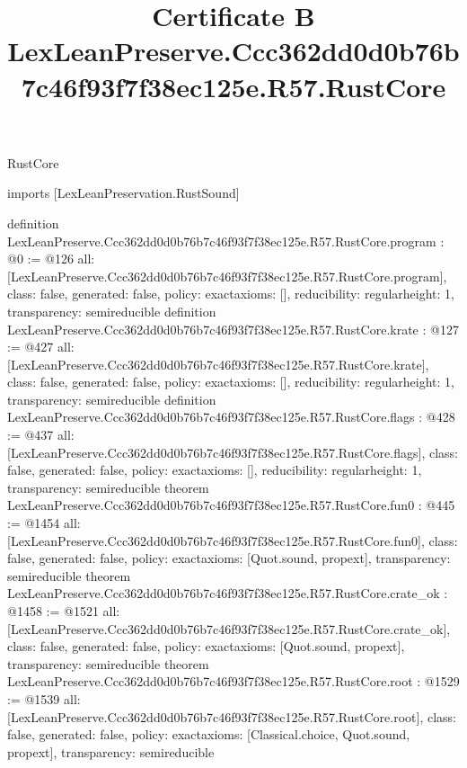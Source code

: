 \begin{lexlean}{RustCore}
\title{Certificate B LexLeanPreserve.Ccc362dd0d0b76b7c46f93f7f38ec125e.R57.RustCore}
\begin{coremodule}
imports [LexLeanPreservation.RustSound]

definition LexLeanPreserve.Ccc362dd0d0b76b7c46f93f7f38ec125e.R57.RustCore.program : @0 := @126 {
  all: [LexLeanPreserve.Ccc362dd0d0b76b7c46f93f7f38ec125e.R57.RustCore.program],
  class: false,
  generated: false,
  policy: exact{axioms: []},
  reducibility: regular{height: 1},
  transparency: semireducible
}
definition LexLeanPreserve.Ccc362dd0d0b76b7c46f93f7f38ec125e.R57.RustCore.krate : @127 := @427 {
  all: [LexLeanPreserve.Ccc362dd0d0b76b7c46f93f7f38ec125e.R57.RustCore.krate],
  class: false,
  generated: false,
  policy: exact{axioms: []},
  reducibility: regular{height: 1},
  transparency: semireducible
}
definition LexLeanPreserve.Ccc362dd0d0b76b7c46f93f7f38ec125e.R57.RustCore.flags : @428 := @437 {
  all: [LexLeanPreserve.Ccc362dd0d0b76b7c46f93f7f38ec125e.R57.RustCore.flags],
  class: false,
  generated: false,
  policy: exact{axioms: []},
  reducibility: regular{height: 1},
  transparency: semireducible
}
theorem LexLeanPreserve.Ccc362dd0d0b76b7c46f93f7f38ec125e.R57.RustCore.fun0 : @445 := @1454 {
  all: [LexLeanPreserve.Ccc362dd0d0b76b7c46f93f7f38ec125e.R57.RustCore.fun0],
  class: false,
  generated: false,
  policy: exact{axioms: [Quot.sound, propext]},
  transparency: semireducible
}
theorem LexLeanPreserve.Ccc362dd0d0b76b7c46f93f7f38ec125e.R57.RustCore.crate_ok : @1458 := @1521 {
  all: [LexLeanPreserve.Ccc362dd0d0b76b7c46f93f7f38ec125e.R57.RustCore.crate_ok],
  class: false,
  generated: false,
  policy: exact{axioms: [Quot.sound, propext]},
  transparency: semireducible
}
theorem LexLeanPreserve.Ccc362dd0d0b76b7c46f93f7f38ec125e.R57.RustCore.root : @1529 := @1539 {
  all: [LexLeanPreserve.Ccc362dd0d0b76b7c46f93f7f38ec125e.R57.RustCore.root],
  class: false,
  generated: false,
  policy: exact{axioms: [Classical.choice, Quot.sound, propext]},
  transparency: semireducible
}


\end{coremodule}
\end{lexlean}
